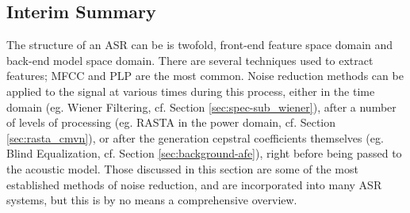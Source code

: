 % 

\subsection{Interim Summary}
% 
The structure of an ASR can be is twofold, front-end feature space domain and back-end model space domain.  There are several techniques used to extract features; MFCC and PLP are the most common. Noise reduction methods can be applied to the signal at various times during this process, either in the time domain (eg. Wiener Filtering, cf. Section \ref{sec:spec-sub_wiener}), after a number of levels of processing (eg. RASTA in the power domain, cf. Section \ref{sec:rasta_cmvn}), or after the generation cepstral coefficients themselves (eg. Blind Equalization, cf. Section \ref{sec:background-afe}), right before being passed to the acoustic model.  Those discussed in this section are some of the most established methods of noise reduction, and are incorporated into many ASR systems, but this is by no means a comprehensive overview.  

